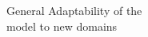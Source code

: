 \documentclass[preview]{standalone}
\begin{document}
General Adaptability of the \\model to new domains\\
\end{document}

